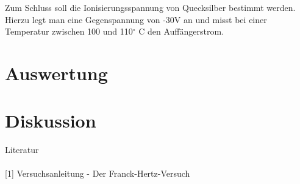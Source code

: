 Zum Schluss soll die Ionisierungsspannung von Quecksilber bestimmt werden. Hierzu legt man eine Gegenspannung von -30V an und misst bei einer Temperatur zwischen 100 und 110$^\circ$ C den Auffängerstrom.
\section{Auswertung}

\section{Diskussion}


\parskip 300pt
\Large{Literatur}\\\\
\large{[1] Versuchsanleitung - Der Franck-Hertz-Versuch}\\\\




